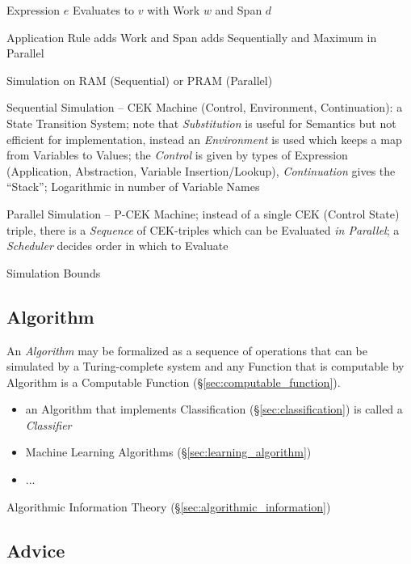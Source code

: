 Expression $e$ Evaluates to $v$ with Work $w$ and Span $d$

Application Rule adds Work and Span adds Sequentially and Maximum in Parallel

Simulation on RAM (Sequential) or PRAM (Parallel)

Sequential Simulation -- CEK Machine (Control, Environment, Continuation): a
State Transition System; note that \emph{Substitution} is useful for Semantics
but not efficient for implementation, instead an \emph{Environment} is used
which keeps a map from Variables to Values; the \emph{Control} is given by types
of Expression (Application, Abstraction, Variable Insertion/Lookup),
\emph{Continuation} gives the ``Stack''; Logarithmic in number
of Variable Names

Parallel Simulation -- P-CEK Machine; instead of a single CEK (Control State)
triple, there is a \emph{Sequence} of CEK-triples which can be Evaluated
\emph{in Parallel}; a \emph{Scheduler} decides order in which to Evaluate

Simulation Bounds



\subsection{Algorithm}\label{sec:algorithm}

An \emph{Algorithm} may be formalized as a sequence of operations that
can be simulated by a Turing-complete system and any Function that is
computable by Algorithm is a Computable Function
(\S\ref{sec:computable_function}).

\begin{itemize}
  \item an Algorithm that implements Classification (\S\ref{sec:classification})
    is called a \emph{Classifier}
  \item Machine Learning Algorithms (\S\ref{sec:learning_algorithm})
  \item ...
\end{itemize}

\fist Algorithmic Information Theory (\S\ref{sec:algorithmic_information})



\subsection{Advice}\label{sec:advice}

